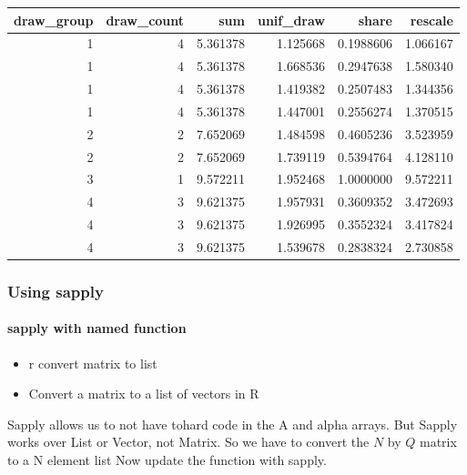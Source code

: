 \documentclass[
]{book}
\providecommand{\tightlist}{%
  \setlength{\itemsep}{0pt}\setlength{\parskip}{0pt}}
\begin{document}
\begin{table}[!h]
\centering
\begin{tabular}{r|r|r|r|r|r}
\hline
draw\_group & draw\_count & sum & unif\_draw & share & rescale\\
\hline
\rowcolor{gray!6}  1 & 4 & 5.361378 & 1.125668 & 0.1988606 & 1.066167\\
\hline
1 & 4 & 5.361378 & 1.668536 & 0.2947638 & 1.580340\\
\hline
\rowcolor{gray!6}  1 & 4 & 5.361378 & 1.419382 & 0.2507483 & 1.344356\\
\hline
1 & 4 & 5.361378 & 1.447001 & 0.2556274 & 1.370515\\
\hline
\rowcolor{gray!6}  2 & 2 & 7.652069 & 1.484598 & 0.4605236 & 3.523959\\
\hline
2 & 2 & 7.652069 & 1.739119 & 0.5394764 & 4.128110\\
\hline
\rowcolor{gray!6}  3 & 1 & 9.572211 & 1.952468 & 1.0000000 & 9.572211\\
\hline
4 & 3 & 9.621375 & 1.957931 & 0.3609352 & 3.472693\\
\hline
\rowcolor{gray!6}  4 & 3 & 9.621375 & 1.926995 & 0.3552324 & 3.417824\\
\hline
4 & 3 & 9.621375 & 1.539678 & 0.2838324 & 2.730858\\
\hline
\end{tabular}
\end{table}

\hypertarget{using-sapply}{%
\subsubsection{Using sapply}\label{using-sapply}}

\hypertarget{sapply-with-named-function}{%
\paragraph{sapply with named function}\label{sapply-with-named-function}}

\begin{itemize}
\tightlist
\item
  r convert matrix to list
\item
  Convert a matrix to a list of vectors in R
\end{itemize}

Sapply allows us to not have tohard code in the A and alpha arrays. But Sapply works over List or Vector, not Matrix. So we have to convert the \(N\) by \(Q\) matrix to a N element list
Now update the function with sapply.
\end{document}
